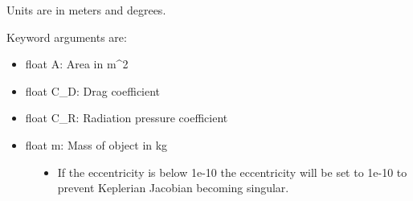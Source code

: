 \documentclass[letterpaper,10pt,english]{sphinxmanual}
\begin{document}
\begin{fulllineitems}
\begin{fulllineitems}

\begin{fulllineitems}
\label{\detokenize{modules/propagator_orekit:propagator_orekit.PropagatorOrekit.OrekitVariableStep.init}}
\end{fulllineitems}


\begin{fulllineitems}
\label{\detokenize{modules/propagator_orekit:propagator_orekit.PropagatorOrekit.OrekitVariableStep.set_params}}
\end{fulllineitems}


\end{fulllineitems}


\begin{fulllineitems}
\label{\detokenize{modules/propagator_orekit:propagator_orekit.PropagatorOrekit.get_orbit}}

Units are in meters and degrees.

Keyword arguments are:
\begin{itemize}
\item {} 
float A: Area in m\textasciicircum{}2

\item {} 
float C\_D: Drag coefficient

\item {} 
float C\_R: Radiation pressure coefficient

\item {} 
float m: Mass of object in kg

\end{itemize}
\begin{description}
\item[{}] \leavevmode\begin{itemize}
\item {} 
If the eccentricity is below 1e-10 the eccentricity will be set to 1e-10 to prevent Keplerian Jacobian becoming singular.


\end{itemize}
\end{description}
\end{fulllineitems}
\end{fulllineitems}
\end{document}
